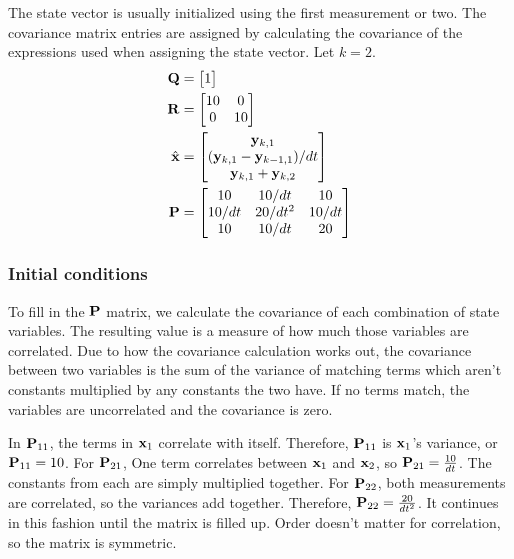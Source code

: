 The \gls{state} vector is usually initialized using the first measurement or
two. The covariance matrix entries are assigned by calculating the covariance of
the expressions used when assigning the state vector. Let $k = 2$.
\begin{align}
  \mathbf{Q} &= \begin{bmatrix}1\end{bmatrix} \\
  \mathbf{R} &=
  \begin{bmatrix}
    10 & 0 \\
    0 & 10
  \end{bmatrix} \\
  \hat{\mathbf{x}} &=
  \begin{bmatrix}
    \mathbf{y}_{k,1} \\
    (\mathbf{y}_{k,1} - \mathbf{y}_{k-1,1})/dt \\
    \mathbf{y}_{k,1} + \mathbf{y}_{k,2}
  \end{bmatrix} \\
  \mathbf{P} &=
  \begin{bmatrix}
    10 & 10/dt & 10 \\
    10/dt & 20/dt^2 & 10/dt \\
    10 & 10/dt & 20
  \end{bmatrix}
\end{align}

\subsubsection{Initial conditions}

To fill in the $\mathbf{P}$ matrix, we calculate the covariance of each combination
of \gls{state} variables. The resulting value is a measure of how much those
variables are correlated. Due to how the covariance calculation works out, the
covariance between two variables is the sum of the variance of matching terms
which aren't constants multiplied by any constants the two have. If no terms
match, the variables are uncorrelated and the covariance is zero.

In $\mathbf{P}_{11}$, the terms in $\mathbf{x}_1$ correlate with itself. Therefore,
$\mathbf{P}_{11}$ is $\mathbf{x}_1$'s variance, or $\mathbf{P}_{11} = 10$. For
$\mathbf{P}_{21}$, One term correlates between $\mathbf{x}_1$ and $\mathbf{x}_2$, so
$\mathbf{P}_{21} = \frac{10}{dt}$. The constants from each are simply multiplied
together. For $\mathbf{P}_{22}$, both measurements are correlated, so the variances
add together. Therefore, $\mathbf{P}_{22} = \frac{20}{dt^2}$. It continues in this
fashion until the matrix is filled up. Order doesn't matter for correlation, so
the matrix is symmetric.


